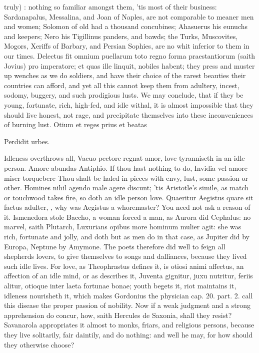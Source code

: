 truly) :
nothing so familiar amongst them, 'tis most of their business:
Sardanapalus, Messalina, and Joan of Naples, are not comparable to
meaner men and women; Solomon of old had a thousand concubines;
Ahasuerus his eunuchs and keepers; Nero his Tigillinus panders, and
bawds; the Turks,  Muscovites, Mogors, Xeriffs of Barbary, and
Persian Sophies, are no whit inferior to them in our times. Delectus
fit omnium puellarum toto regno forma praestantiorum (saith Jovius) pro
imperatore; et quas ille linquit, nobiles habent; they press and muster
up wenches as we do soldiers, and have their choice of the rarest
beauties their countries can afford, and yet all this cannot keep them
from adultery, incest, sodomy, buggery, and such prodigious lusts. We
may conclude, that if they be young, fortunate, rich, high-fed, and
idle withal, it is almost impossible that they should live honest, not
rage, and precipitate themselves into these inconveniences of burning
lust.
Otium et reges prius et beatas

Perdidit urbes.

Idleness overthrows all, Vacuo pectore regnat amor, love tyranniseth in
an idle person. Amore abundas Antiphio. If thou hast nothing to
do, Invidia vel amore miser torquebere-Thou shalt be haled in
pieces with envy, lust, some passion or other. Homines nihil agendo
male agere discunt; 'tis Aristotle's simile, as match or
touchwood takes fire, so doth an idle person love. Quaeritur Aegistus
quare sit factus adulter, \etc{}, why was Aegistus a whoremaster? You need
not ask a reason of it. Ismenedora stole Baccho, a woman forced a man,
as Aurora did Cephalus: no marvel, saith Plutarch,
Luxurians opibus more hominum mulier agit: she was rich, fortunate and
jolly, and doth but as men do in that case, as Jupiter did by Europa,
Neptune by Amymone. The poets therefore did well to feign all shepherds
lovers, to give themselves to songs and dalliances, because they lived
such idle lives. For love, as Theophrastus defines it, is otiosi
animi affectus, an affection of an idle mind, or as \Seneca{}
describes it, Juventa gignitur, juxu nutritur, feriis alitur, otioque
inter laeta fortunae bonae; youth begets it, riot maintains it,
idleness nourisheth it, \etc{} which makes  Gordonius the physician
cap. 20. part. 2. call this disease the proper passion of nobility. Now
if a weak judgment and a strong apprehension do concur, how, saith
Hercules de Saxonia, shall they resist? Savanarola appropriates it
almost to monks, friars, and religious persons, because they live
solitarily, fair daintily, and do nothing: and well he may, for how
should they otherwise choose?

